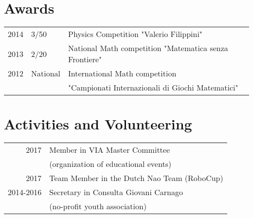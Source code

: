 \documentclass[a4paper]{deedy-resume} %
\begin{document}
\begin{minipage}[t]{0.66\textwidth}

\section{Awards} 

\begin{tabular}{rll}
2014	 & 3/50 & Physics Competition "Valerio Filippini" \\
2013     & 2/20 & National Math competition "Matematica senza Frontiere" \\
2012     & National & International Math competition \\
 & &  "Campionati Internazionali di Giochi Matematici"
\end{tabular}

\sectionspace %


\section{Activities and Volunteering} 

\begin{tabular}{rl}
2017 &  Member in VIA Master Committee \\
     & (organization of educational events)\\
2017 &  Team Member in the Dutch Nao Team (RoboCup)\\
2014-2016 &  Secretary in Consulta Giovani Carnago \\
  &(no-profit youth association)\\
\end{tabular}

\sectionspace %


\end{minipage} %


\end{document}
